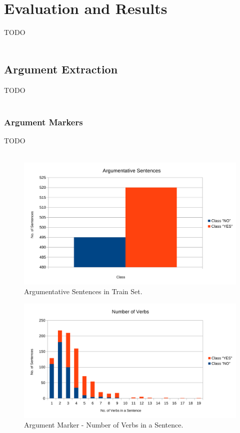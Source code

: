 \chapter{Evaluation and Results}
TODO\\
\\
\section{Argument Extraction}\label{41_ref}
TODO\\
\\
\subsection{Argument Markers}\label{411_ref}
TODO\\
\\
\begin{figure}[H]
\centering
\includegraphics[width=0.9\linewidth]{figure/arguments/A_argumentative1.pdf}
\caption{Argumentative Sentences in Train Set.}
\end{figure}

\begin{figure}[H]
\centering
\includegraphics[width=0.8\linewidth]{figure/arguments/A_verbs1.pdf}
\caption{Argument Marker - Number of Verbs in a Sentence.}
\end{figure}

